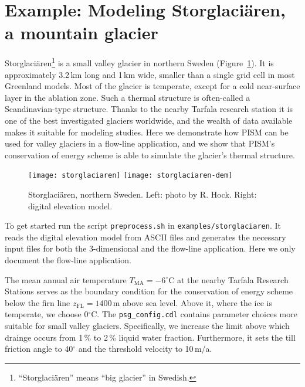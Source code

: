 
\section{Example: Modeling Storglaci{\"a}ren, a mountain glacier}\label{sec:storglaciaren} 

Storglaci{\"a}ren\footnote{``Storglaci{\"a}ren'' means ``big glacier'' in Swedish.} is a small valley glacier in northern Sweden (Figure~\ref{fig:storglaciaren}).  It is approximately 3.2\,km long and 1\,km wide, smaller than a single grid cell in most Greenland models.  Most of the glacier is temperate, except for a cold near-surface layer in the ablation zone.  Such a thermal structure is often-called a Scandinavian-type structure.  Thanks to the nearby Tarfala research station it is one of the best investigated glaciers worldwide, and the wealth of data available makes it suitable for modeling studies.  Here we demonstrate how PISM can be used for valley glaciers in a flow-line application, and we show that PISM's conservation of energy scheme is able to simulate the glacier's thermal structure.

\begin{figure}[ht]
  \centering
  \texttt{[image: storglaciaren]}\qquad
  \texttt{[image: storglaciaren-dem]}
  \caption{Storglaci{\"a}ren, northern Sweden. Left: photo by R. Hock. Right: digital elevation model.}
  \label{fig:storglaciaren}
\end{figure}

To get started run the script \texttt{preprocess.sh} in \texttt{examples/storglaciaren}. It reads the digital elevation model from ASCII files and generates the necessary input files for both the 3-dimensional and the flow-line application. Here we only document the flow-line application.

The mean annual air temperature $T_{\mathrm{MA}}=-6^{\circ}$C at the nearby Tarfala Research Stations serves as the boundary condition for the conservation of energy scheme below the firn line $z_{\textrm{FL}} = 1400$\,m above sea level. Above it, where the ice is temperate, we choose 0$^{\circ}$C. The \texttt{psg_config.cdl} contains parameter choices more suitable for small valley glaciers. Specifically, we increase the limit above which drainge occurs from 1\,\% to 2\,\% liquid water fraction. Furthermore, it sets the till friction angle to 40$^{\circ}$ and the threshold velocity to 10\,m/a.

